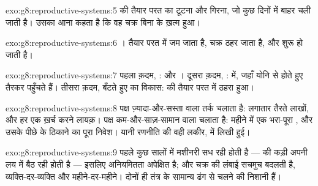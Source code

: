 \begin{solution}{exo:g8:reproductive-systems:5}
 की तैयार परत का टूटना और गिरना, जो कुछ दिनों में बाहर चली जाती
है। उसका आना कहता है कि वह चक्र बिना  के ख़त्म हुआ।
\end{solution}

\begin{solution}{exo:g8:reproductive-systems:6}
।  तैयार परत में जम जाता है, चक्र ठहर जाता है, और
 शुरू हो जाती है।
\end{solution}

\begin{solution}{exo:g8:reproductive-systems:7}
पहला क़दम, :  और । दूसरा क़दम, :  में,
जहाँ  योनि से  होते हुए तैरकर पहुँचते हैं। तीसरा क़दम,
बँटते हुए  का विकास:  की तैयार परत में ठहरा हुआ।
\end{solution}

\begin{solution}{exo:g8:reproductive-systems:8}
 पक्ष ज़्यादा-और-सस्ता वाला तर्क चलाता है: लगातार तैरते लाखों, और हर
एक ख़र्च करने लायक़।  पक्ष कम-और-साज़-सामान वाला चलाता है: महीने में
एक भरा-पूरा , और उसके पीछे  के ठिकाने का पूरा निवेश। यानी
रणनीति की वही लकीर,  में लिखी हुई।
\end{solution}

\begin{solution}{exo:g8:reproductive-systems:9}
पहले कुछ सालों में मशीनरी सध रही होती है ---  की कड़ी अपनी लय में
बैठ रही होती है --- इसलिए अनियमितता अपेक्षित है; और चक्र की लंबाई सचमुच
बदलती है, व्यक्ति-दर-व्यक्ति और महीने-दर-महीने। दोनों ही तंत्र के
सामान्य ढंग से चलने की निशानी हैं।
\end{solution}

